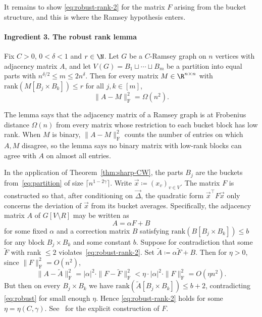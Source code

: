 It remains to show \eqref{eq:robust-rank-2} for the matrix $F$ arising from the bucket structure, and this is where the Ramsey hypothesis enters.

\paragraph{Ingredient 3. The robust rank lemma}

\begin{lemma}
\label{lem:robust-rank}
  Fix $C > 0$, $0 < \delta < 1$ and $r \in \N$. Let $G$ be a $C$-Ramsey graph on $n$ vertices with adjacency matrix $A$, and let $V(G) = B_1 \sqcup \cdots \sqcup B_m$ be a partition into equal parts with $n^{\delta/2} \leq m \leq 2n^{\delta}$. Then for every matrix $M \in \R^{n \times n}$ with $\mathrm{rank}(M[B_j \times B_k]) \leq r$ for all $j, k \in [m]$,
  \begin{equation}
    \label{eq:robust}
    \|A - M\|_{\mathrm{F}}^2 = \Omega(n^2).
  \end{equation}
\end{lemma}

The lemma says that the adjacency matrix of a Ramsey graph is at Frobenius distance $\Omega(n)$ from every matrix whose restriction to each bucket block has low rank. When $M$ is binary, $\|A - M\|_{\mathrm{F}}^2$ counts the number of entries on which $A, M$ disagree, so the lemma says no binary matrix with low-rank blocks can agree with $A$ on almost all entries.

In the application of Theorem~\ref{thm:sharp-CW}, the parts $B_j$ are the buckets from~\eqref{eq:partition} of size $\lceil n^{1-2\gamma} \rceil$. Write $\vec x \coloneqq (x_v)_{v \in V}$. The matrix $F$ is constructed so that, after conditioning on $\vec \Delta$, the quadratic form $\vec x^{\top} F \vec x$ only concerns the deviation of $\vec x$ from its bucket averages. Specifically, the adjacency matrix $A$ of $G[V \setminus R]$ may be written as
\[
  A = \alpha F + B
\]
for some fixed $\alpha$ and a correction matrix $B$ satisfying $\mathrm{rank}(B[B_j \times B_k]) \leq b$ for any block $B_j \times B_k$ and some constant $b$. Suppose for contradiction that some $\tilde{F}$ with rank $\leq 2$ violates~\eqref{eq:robust-rank-2}. Set $\tilde{A} \coloneqq \alpha \tilde{F} + B$. Then for $\eta > 0$, since $\|F\|_{\mathrm{F}}^2 = O(n^2)$,
\[
  \|A - \tilde A\|_{\mathrm{F}}^2 = |\alpha|^2 \cdot \|F - \tilde F\|_{\mathrm{F}}^2 < \eta \cdot |\alpha|^2 \cdot \|F\|_{\mathrm{F}}^2 = O(\eta n^2).
\] 
But then on every $B_j \times B_k$ we have $\mathrm{rank}(\tilde{A}[B_j \times B_k]) \leq b + 2$, contradicting \eqref{eq:robust} for small enough $\eta$. Hence \eqref{eq:robust-rank-2} holds for some $\eta = \eta(C, \gamma)$. See~\cite[Section~12]{Kwan_2023} for the explicit construction of $F$.

